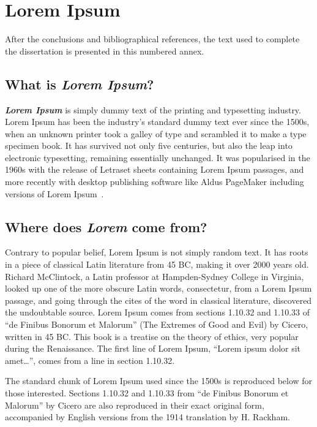 \chapter{Lorem Ipsum} \label{ap1:Lorem}

After the conclusions and bibliographical references,
the text used to complete the dissertation is presented in this 
numbered annex. 

\section{What is \emph{Lorem Ipsum}?}

\emph{\textbf{Lorem Ipsum}} is simply dummy text of the printing and
typesetting industry. Lorem Ipsum has been the industry's standard
dummy text ever since the 1500s, when an unknown printer took a galley
of type and scrambled it to make a type specimen book. It has survived
not only five centuries, but also the leap into electronic
typesetting, remaining essentially unchanged. It was popularised in
the 1960s with the release of Letraset sheets containing Lorem Ipsum
passages, and more recently with desktop publishing software like
Aldus PageMaker including versions of Lorem Ipsum~\cite{kn:Lip08}. 

\section{Where does \emph{Lorem} come from?}

Contrary to popular belief, Lorem Ipsum is not simply random text. It
has roots in a piece of classical Latin literature from 45 BC, making
it over 2000 years old. Richard McClintock, a Latin professor at
Hampden-Sydney College in Virginia, looked up one of the more obscure
Latin words, consectetur, from a Lorem Ipsum passage, and going
through the cites of the word in classical literature, discovered the
undoubtable source. Lorem Ipsum comes from sections 1.10.32 and
1.10.33 of ``de Finibus Bonorum et Malorum'' (The Extremes of Good and
Evil) by Cicero, written in 45 BC. This book is a treatise on the
theory of ethics, very popular during the Renaissance. The first line
of Lorem Ipsum, ``Lorem ipsum dolor sit amet\ldots'', comes from a line in
section 1.10.32.

The standard chunk of Lorem Ipsum used since the 1500s is reproduced
below for those interested. Sections 1.10.32 and 1.10.33 from ``de
Finibus Bonorum et Malorum'' by Cicero are also reproduced in their
exact original form, accompanied by English versions from the 1914
translation by H. Rackham.

